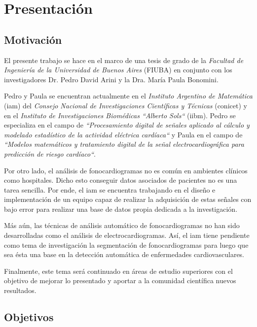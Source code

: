 \chapter{Presentación} \label{ch:presentation}

\section{Motivación} \label{sec:motivation}

\indent El presente trabajo se hace en el marco de una tesis de grado de la \textit{Facultad de Ingeniería de la
Universidad de Buenos Aires} (FIUBA) en conjunto con los investigadores Dr. Pedro David Arini y la Dra. María Paula
Bonomini. \bigskip

\indent Pedro y Paula se encuentran actualmente en el \textit{Instituto Argentino de Matemática} (\acrshort{iam})
del \textit{Consejo Nacional de Investigaciones Científicas y Técnicas} (\acrshort{conicet}) y en el
\textit{Instituto de Investigaciones Biomédicas ``Alberto Sols``} (\acrshort{iibm}).
Pedro se especializa en el campo de \textit{``Procesamiento digital de señales aplicado al cálculo y modelado
estadístico de la actividad eléctrica cardíaca``} y Paula en el campo de \textit{``Modelos matemáticos y tratamiento
digital de la señal electrocardiográfica para predicción de riesgo cardíaco``}. \bigskip

\indent Por otro lado, el análisis de fonocardiogramas no es común en ambientes clínicos como hospitales.
Dicho esto conseguir datos asociados de pacientes no es una tarea sencilla.
Por ende, el \acrshort{iam} se encuentra trabajando en el diseño e implementación de un equipo capaz de realizar la
adquisición de estas señales con bajo error para realizar una base de datos propia dedicada a la investigación.

\indent Más aún, las técnicas de análisis automático de fonocardiogramas no han sido desarrolladas como el análisis
de electrocardiogramas.
Así, el \acrshort{iam} tiene pendiente como tema de investigación la segmentación de fonocardiogramas para luego que
sea ésta una base en la detección automática de enfermedades cardiovasculares. \bigskip

\indent Finalmente, este tema será continuado en áreas de estudio superiores con el objetivo de mejorar lo presentado y
aportar a la comunidad científica nuevos resultados.

\newpage

\section{Objetivos} \label{sec:objectives}

